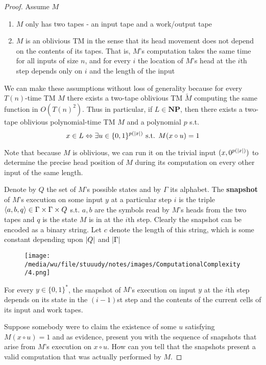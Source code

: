 \documentclass[11pt]{article}
\def \NP {\textbf{NP}}
\def \NP {\textbf{NP}}
\begin{document}
\begin{enumerate}
\begin{proof}
Assume \(M\)
\begin{enumerate}
\item \(M\) only has two tapes - an input tape and a work/output tape
\item \(M\) is an oblivious TM in the sense that its head movement does not depend on the contents
of its tapes. That is, \(M\)'s computation takes the same time for all inputs of size \(n\),
and for every \(i\) the location of \(M\)'s head at the \(i\)th step depends only on \(i\)
and the length of the input
\end{enumerate}


We can make these assumptions without loss of generality because for every \(T(n)\)-time TM \(M\)
there exists a two-tape oblivious TM \(\tilde{M}\) computing the same function
in \(O(T(n)^2)\). Thus in particular, if \(L\in\NP\), then there exists a two-tape oblivious
polynomial-time TM \(M\) and a polynomial \(p\) s.t.
     \begin{equation}
     \label{eq:2.2}
x\in L \Leftrightarrow \exists u\in\{0,1\}^{p(\abs{x})}\text{ s.t. }M(x\circ u)=1
     \end{equation}

Note that because \(M\) is oblivious, we can run it on the trivial input \((x,0^{p(\abs{x})})\)
to determine the precise head position of \(M\) during its computation on every other input of
the same length.

Denote by \(Q\) the set of \(M\)'s possible states and by \(\Gamma\) its alphabet. The \textbf{snapshot}
of \(M\)'s execution on some input \(y\) at a particular step \(i\) is the triple
\(\langle a,b,q\rangle\in\Gamma\times\Gamma\times Q\) s.t. \(a,b\) are the symbols read by \(M\)'s
heads from the two tapes and \(q\) is the state \(M\) is in at the \(i\)th step. Clearly the
snapshot can be encoded as a binary string. Let \(c\) denote the length of this string, which
is some constant depending upon \(\abs{Q}\) and \(\abs{\Gamma}\)

\begin{figure}[htbp]
\centering
\texttt{[image: /media/wu/file/stuuudy/notes/images/ComputationalComplexity/4.png]}
\end{figure}

For every \(y\in\{0,1\}^*\), the snapshot of \(M\)'s execution on input \(y\) at the \(i\)th
step depends on its state in the \((i-1)\)st step and the contents of the current cells of its
input and work tapes.

Suppose somebody were to claim the existence of some \(u\) satisfying \(M(x\circ u)=1\) and as
evidence, present you with the sequence of snapshots that arise from \(M\)'s execution
on \(x\circ u\). How can you tell that the snapshots present a valid computation that was
actually performed by \(M\).


\end{proof}
\end{enumerate}
\end{document}
